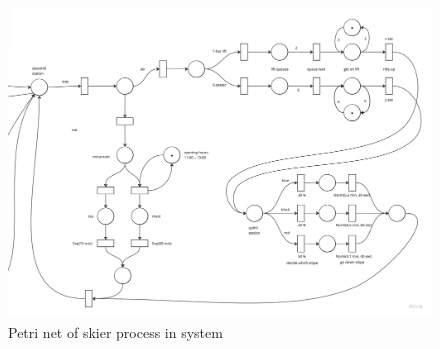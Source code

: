\documentclass[11pt,a4paper]{article}
\begin{document}
 \begin{figure}[H]
    \centering
    \includegraphics[width=0.85 \linewidth]{doc/petri-2.jpg}
    \caption{Petri net of skier process in system}
\end{figure}
\end{document}
